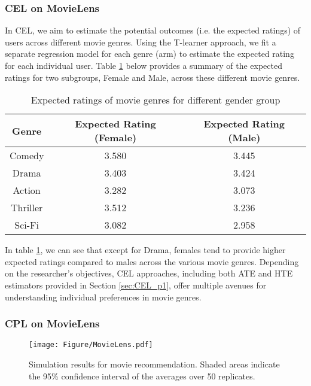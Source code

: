 

\subsubsection{\acrshort{CEL} on MovieLens}
In \acrshort{CEL}, we aim to estimate the potential outcomes (i.e. the expected ratings) of users across different movie genres. %
Using the T-learner approach, we fit a separate regression model for each genre (arm) to estimate the expected rating for each individual user. Table \ref{tab:CEL_movielens} below provides a summary of the expected ratings for two subgroups, Female and Male, across these different movie genres.
\begin{table}[h!]
\centering
\begin{tabular}{c|c|c}
\hline
\textbf{Genre} & {Expected Rating (Female)} & {Expected Rating (Male)} \\ \hline
        Comedy  & 3.580 & 3.445 \\
        Drama   & 3.403 & 3.424 \\
        Action  & 3.282 & 3.073 \\
        Thriller & 3.512 & 3.236 \\
        Sci-Fi  & 3.082 & 2.958 \\ \hline
\end{tabular}
\caption{Expected ratings of movie genres for different gender group}\label{tab:CEL_movielens}
\end{table}

In table \ref{tab:CEL_movielens}, we can see that except for Drama, females tend to provide higher expected ratings compared to males across the various movie genres. Depending on the researcher's objectives, \acrshort{CEL} approaches, including both ATE and HTE estimators provided in Section \ref{sec:CEL_p1}, offer multiple avenues for understanding individual preferences in movie genres.


\subsubsection{\acrshort{CPL} on MovieLens}
\begin{figure}
    \centering
    \texttt{[image: Figure/MovieLens.pdf]}
    \caption{Simulation results for movie recommendation. Shaded areas indicate the 95\% confidence interval of the averages over 50 replicates.}
    \label{Fig:MovieLens_result}
\end{figure}


